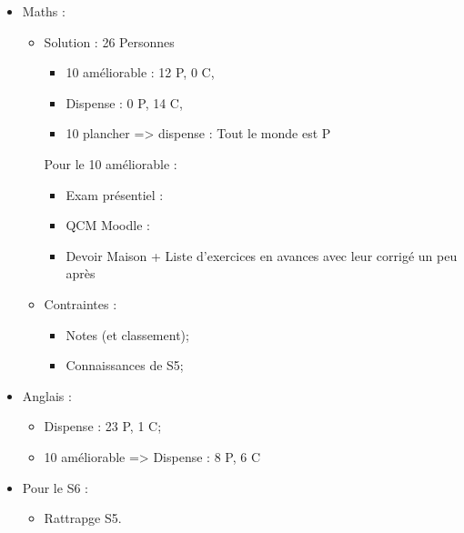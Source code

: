 \documentclass{article}
\begin{document}
\begin{itemize}
    \item Maths :
        \begin{itemize}
            \item Solution : 26 Personnes
                \begin{itemize}
                    \item 10 améliorable : 12 P, 0 C,
                    \item Dispense : 0 P, 14 C, 
                    \item 10 plancher => dispense : Tout le monde est P
                \end{itemize}
                Pour le 10 améliorable : 
                \begin{itemize}
                    \item Exam présentiel : 
                    \item QCM Moodle : 
                    \item Devoir Maison + Liste d'exercices en avances avec leur corrigé un peu après
                \end{itemize}
            \item Contraintes : 
                \begin{itemize}
                    \item Notes (et classement);
                    \item Connaissances de S5;
                \end{itemize}
        \end{itemize}
    \item Anglais : 
        \begin{itemize}
            \item Dispense : 23 P, 1 C;
            \item 10 améliorable => Dispense : 8 P, 6 C
        \end{itemize}
    \item Pour le S6 :
        \begin{itemize}
            \item Rattrapge S5.
        \end{itemize}
\end{itemize}
\end{document}
